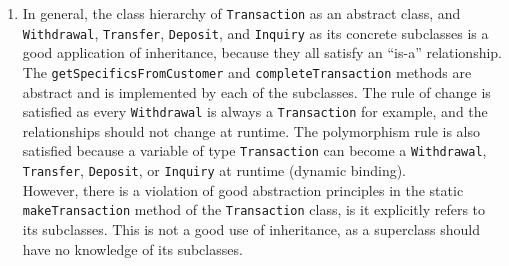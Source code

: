 \documentclass{report}
\begin{document}
\begin{enumerate}
    \item In general, the class hierarchy of \texttt{Transaction} as an
    abstract class, and \texttt{Withdrawal}, \texttt{Transfer},
    \texttt{Deposit}, and \texttt{Inquiry} as its concrete subclasses is a
    good application of inheritance, because they all satisfy an ``is-a''
    relationship. The \texttt{getSpecificsFromCustomer} and
    \texttt{completeTransaction} methods are abstract and is implemented
    by each of the subclasses. The rule of change is satisfied as every
    \texttt{Withdrawal} is always a \texttt{Transaction} for example, and
    the relationships should not change at runtime. The polymorphism rule
    is also satisfied because a variable of type \texttt{Transaction} can
    become a \texttt{Withdrawal}, \texttt{Transfer}, \texttt{Deposit}, or
    \texttt{Inquiry} at runtime (dynamic binding). \\
    However, there is a violation of good abstraction principles in the static
    \texttt{makeTransaction} method of the \texttt{Transaction} class,
    is it explicitly refers to its subclasses. This is not a good use of
    inheritance, as a superclass should have no knowledge of its subclasses.

\end{enumerate}
\end{document}
